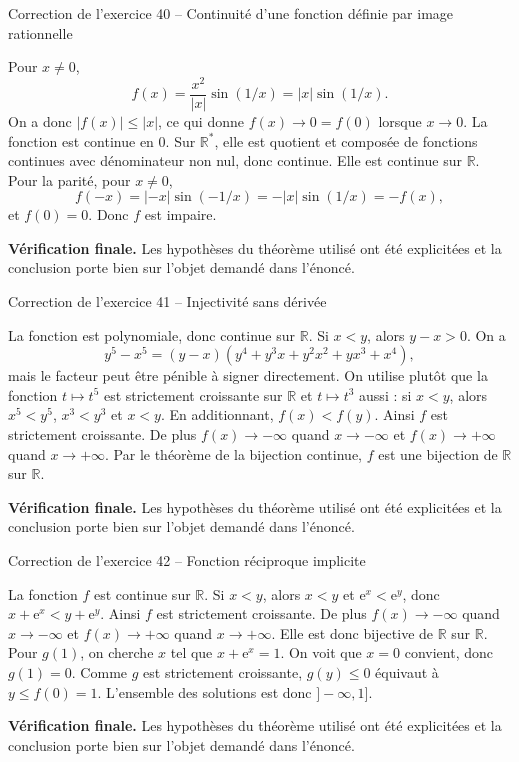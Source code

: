 \documentclass[11pt,a4paper]{article}
\newcommand{\R}{\mathbb{R}}
\newcommand{\e}{\mathrm{e}}
\begin{document}
\begin{corrbox}{Correction de l'exercice 40 -- Continuité d'une fonction définie par image rationnelle}

Pour $x\neq0$,
\[
f(x)=\frac{x^2}{|x|}\sin(1/x)=|x|\sin(1/x).
\]
On a donc $|f(x)|\leq |x|$, ce qui donne $f(x)\to0=f(0)$ lorsque $x\to0$. La fonction est continue en $0$. Sur $\R^*$, elle est quotient et composée de fonctions continues avec dénominateur non nul, donc continue. Elle est continue sur $\R$. Pour la parité, pour $x\neq0$,
\[
f(-x)=|-x|\sin(-1/x)=-|x|\sin(1/x)=-f(x),
\]
et $f(0)=0$. Donc $f$ est impaire.

\medskip
\textbf{Vérification finale.} Les hypothèses du théorème utilisé ont été explicitées et la conclusion porte bien sur l'objet demandé dans l'énoncé.
\end{corrbox}


\begin{corrbox}{Correction de l'exercice 41 -- Injectivité sans dérivée}

La fonction est polynomiale, donc continue sur $\R$. Si $x<y$, alors $y-x>0$. On a
\[
y^5-x^5=(y-x)(y^4+y^3x+y^2x^2+yx^3+x^4),
\]
mais le facteur peut être pénible à signer directement. On utilise plutôt que la fonction $t\mapsto t^5$ est strictement croissante sur $\R$ et $t\mapsto t^3$ aussi : si $x<y$, alors $x^5<y^5$, $x^3<y^3$ et $x<y$. En additionnant, $f(x)<f(y)$. Ainsi $f$ est strictement croissante. De plus $f(x)\to-\infty$ quand $x\to-\infty$ et $f(x)\to+\infty$ quand $x\to+\infty$. Par le théorème de la bijection continue, $f$ est une bijection de $\R$ sur $\R$.

\medskip
\textbf{Vérification finale.} Les hypothèses du théorème utilisé ont été explicitées et la conclusion porte bien sur l'objet demandé dans l'énoncé.
\end{corrbox}


\begin{corrbox}{Correction de l'exercice 42 -- Fonction réciproque implicite}

La fonction $f$ est continue sur $\R$. Si $x<y$, alors $x<y$ et $\e^x<\e^y$, donc $x+\e^x<y+\e^y$. Ainsi $f$ est strictement croissante. De plus $f(x)\to-\infty$ quand $x\to-\infty$ et $f(x)\to+\infty$ quand $x\to+\infty$. Elle est donc bijective de $\R$ sur $\R$.
Pour $g(1)$, on cherche $x$ tel que $x+\e^x=1$. On voit que $x=0$ convient, donc $g(1)=0$. Comme $g$ est strictement croissante, $g(y)\leq0$ équivaut à $y\leq f(0)=1$. L'ensemble des solutions est donc $]-\infty,1]$.

\medskip
\textbf{Vérification finale.} Les hypothèses du théorème utilisé ont été explicitées et la conclusion porte bien sur l'objet demandé dans l'énoncé.
\end{corrbox}
\end{document}
